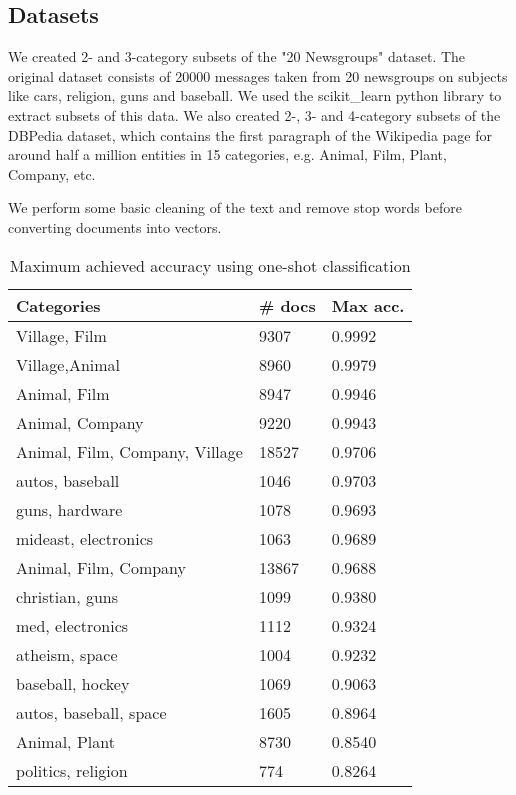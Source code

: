 \documentclass{article} %
\begin{document}
\subsection{Datasets}
We created 2- and 3-category subsets of the "20 Newsgroups" dataset. The original dataset consists of 20000 messages taken from 20 newsgroups on subjects like cars, religion, guns and baseball. We used the scikit\_learn python library to extract subsets of this data. We also created 2-, 3- and 4-category subsets of the DBPedia dataset, which contains the first paragraph of the Wikipedia page for around half a million entities in 15 categories, e.g. Animal, Film, Plant, Company, etc.

We perform some basic cleaning of the text and remove stop words before converting documents into vectors.

\begin{table}[]
\centering
\captionsetup{position=bottom}
\begin{tabular}{lll}
\toprule
Categories                  & \# docs & Max acc. \\
\midrule
Village, Film                & 9307         & 0.9992       \\
Village,Animal              & 8960         & 0.9979       \\
Animal, Film                 & 8947         & 0.9946       \\
Animal, Company              & 9220         & 0.9943       \\
Animal, Film, Company, Village & 18527        & 0.9706       \\
autos, baseball              & 1046         & 0.9703       \\
guns, hardware               & 1078         & 0.9693       \\
mideast, electronics         & 1063         & 0.9689       \\
Animal, Film, Company         & 13867        & 0.9688       \\
christian, guns              & 1099         & 0.9380       \\
med, electronics             & 1112         & 0.9324       \\
atheism, space               & 1004         & 0.9232       \\
baseball, hockey             & 1069         & 0.9063       \\
autos, baseball, space        & 1605         & 0.8964       \\
Animal, Plant                & 8730         & 0.8540       \\
politics, religion           & 774          & 0.8264      \\
\bottomrule
\end{tabular}
\caption{Maximum achieved accuracy using one-shot classification}\label{bruteforce}
\end{table}
\end{document}
